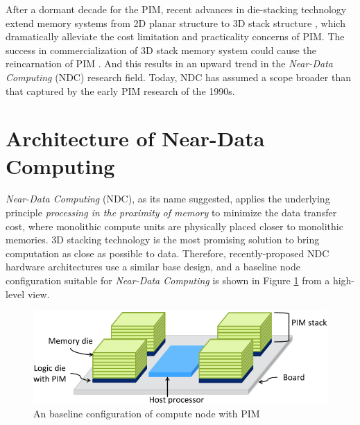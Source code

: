 \documentclass[letterpaper, 11pt, conference, margin=1in]{ieeeconf}   %
\begin{document}
After a dormant decade for the PIM, recent advances in die-stacking technology extend memory systems from 2D planar structure to 3D stack structure \cite{Papanikolaou:2010:TDS:1965079, 6176900, 6131504}, which dramatically alleviate the cost limitation and practicality concerns of PIM. The success in commercialization of 3D stack memory system could cause the reincarnation of PIM \cite{Micron, AMD}. And this results in an upward trend in the \textit{Near-Data Computing} (NDC) research field. Today, NDC has assumed a scope broader than that captured by the early PIM research of the 1990s.


\section{Architecture of Near-Data Computing}
\textit{Near-Data Computing} (NDC), as its name suggested, applies the underlying principle \textit{processing in the proximity of memory} to minimize the data transfer cost, where monolithic compute units are physically placed closer to monolithic memories. 3D stacking technology is the most promising solution to bring computation as close as possible to data. Therefore, recently-proposed NDC hardware architectures use a similar base design, and a baseline node configuration suitable for \textit{Near-Data Computing} is shown in Figure \ref{fig:baseline} from a high-level view.

\begin{figure}[ht]
  \centering
  \includegraphics[scale=0.35]{architecture.png}
  \caption{An baseline configuration of compute node with PIM}
  \label{fig:baseline}
\end{figure}
\end{document}
